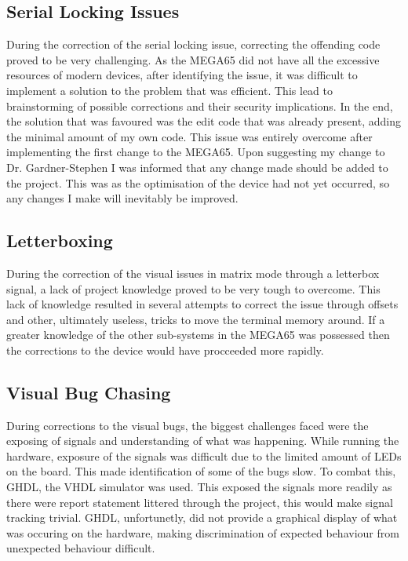 \subsection{Serial Locking Issues}

\label{Ch7 Sec1 Sub2}

During the correction of the serial locking issue, correcting the offending code proved to be very challenging. As the MEGA65 did not have all the excessive resources of modern devices, after identifying the issue, it was difficult to implement a solution to the problem that was efficient. This lead to brainstorming of possible corrections and their security implications. In the end, the solution that was favoured was the edit code that was already present, adding the minimal amount of my own code. This issue was entirely overcome after implementing the first change to the MEGA65. Upon suggesting my change to Dr. Gardner-Stephen I was informed that any change made should be added to the project. This was as the optimisation of the device had not yet occurred, so any changes I make will inevitably be improved.  

\subsection{Letterboxing}

\label{Ch7 Sec1 Sub3}

During the correction of the visual issues in matrix mode through a letterbox signal, a lack of project knowledge proved to be very tough to overcome. This lack of knowledge resulted in several attempts to correct the issue through offsets and other, ultimately useless, tricks to move the terminal memory around. If a greater knowledge of the other sub-systems in the MEGA65 was possessed then the corrections to the device would have procceeded more rapidly.

\subsection{Visual Bug Chasing}

\label{Ch7 Sec1 Sub4}

During corrections to the visual bugs, the biggest challenges faced were the exposing of signals and understanding of what was happening. While running the hardware, exposure of the signals was difficult due to the limited amount of LEDs on the board. This made identification of some of the bugs slow. To combat this, GHDL, the VHDL simulator was used. This exposed the signals more readily as there were report statement littered through the project, this would make signal tracking trivial. GHDL, unfortunetly, did not provide a graphical display of what was occuring on the hardware, making discrimination of expected behaviour from unexpected behaviour difficult.

